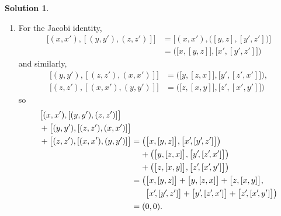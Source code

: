 \documentclass[11pt, a4paper]{report}
\theoremstyle{definition}
\newtheorem{solution}{Solution}[part]
\newenvironment{sol}{\begin{solution}}{\end{solution}\pagebreak[3]}
\newcommand*{\pheq}{\ensuremath\mathrel{\phantom{=}}\negmedspace{}}
\begin{document}
\begin{sol}
\begin{enumerate}
    \item For the Jacobi identity,
    \begin{align*}
        \bigl[ (x, x'), [(y, y'), (z, z')] \bigr]
            &= \bigl[ (x, x'), \bigl( [y, z], [y', z'] \bigr) \bigr] \\
            &= \bigl( \bigl[ x, [y, z] \bigr], \bigl[ x', [y', z'] \bigr] \bigr)
    \end{align*}
    and similarly,
    \begin{align*}
        \bigl[ (y, y'), [(z, z'), (x, x')] \bigr]
            &= \bigl( \bigl[ y, [z, x] \bigr], \bigl[ y', [z', x'] \bigr] \bigr), \\
        \bigl[ (z, z'), [(x, x'), (y, y')] \bigr]
            &= \bigl( \bigl[ z, [x, y] \bigr], \bigl[ z', [x', y'] \bigr] \bigr)
    \end{align*}
    so
    \begin{align*}
        \begin{aligned}[b]
        &\bigl[ (x, x'), [(y, y'), (z, z')] \bigr] \\
        &+ \bigl[ (y, y'), [(z, z'), (x, x')] \bigr] \\
        &+ \bigl[ (z, z'), [(x, x'), (y, y')] \bigr]
        \end{aligned}
            &= \bigl( \bigl[ x, [y, z] \bigr],
                      \bigl[ x'\!, [y'\!, z'] \bigr] \bigr) \\
            &\pheq
               + \bigl( \bigl[ y, [z, x] \bigr],
                        \bigl[ y'\!, [z'\!, x'] \bigr] \bigr) \\
            &\pheq
               + \bigl( \bigl[ z, [x, y] \bigr],
                        \bigl[ z'\!, [x'\!, y'] \bigr] \bigr) \\
            &= \begin{aligned}[t]
                    \bigl( & \bigl[ x, [y, z] \bigr]
                           + \bigl[ y, [z, x] \bigr]
                           + \bigl[ z, [x, y] \bigr], \bigr. \\
                    \bigl. & \bigl[ x'\!, [y'\!, z'] \bigr]
                           + \bigl[ y'\!, [z'\!, x'] \bigr]
                           + \bigl[ z'\!, [x'\!, y'] \bigr] \bigr)
                \end{aligned} \\
            &=(0, 0).
    \end{align*}

\end{enumerate}


\end{sol}
\end{document}
